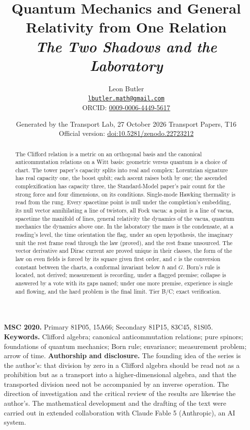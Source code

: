 \documentclass[11pt]{article}
\title{\bfseries Quantum Mechanics and General Relativity from One Relation\\[4pt]\large\itshape The Two Shadows and the Laboratory}
\author{Leon Butler\\ \normalsize\href{mailto:lbutler.math@gmail.com}{\texttt{lbutler.math@gmail.com}}\\ \normalsize ORCID: \href{https://orcid.org/0009-0006-4449-5617}{0009-0006-4449-5617}}
\date{Generated by the Transport Lab, 27 October 2026 \textperiodcentered{} Transport Papers, T16\\[3pt]\small Official version: \href{https://doi.org/10.5281/zenodo.22723212}{doi:10.5281/zenodo.22723212}}
\theoremstyle{definition}
\theoremstyle{plain}
\begin{document}
\maketitle
\begin{abstract}
\normalsize
The Clifford relation is a metric on an orthogonal basis and the canonical anticommutation relations on a Witt basis: geometric versus quantum is a choice of chart. The tower paper's capacity splits into real and complex: Lorentzian signature has real capacity one, the boost qubit; each ascent raises both by one; the ascended complexification has capacity three, the Standard-Model paper's pair count for the strong force and four dimensions, on its conditions. Single-mode Hawking thermality is read from the rung. Every spacetime point is null under the completion's embedding, its null vector annihilating a line of twistors, all Fock vacua: a point is a line of vacua, spacetime the manifold of lines, general relativity the dynamics of the vacua, quantum mechanics the dynamics above one. In the laboratory the mass is the condensate, at a reading's level, the time orientation the flag, under an open hypothesis, the imaginary unit the rest frame read through the law (proved), and the rest frame unsourced. The vector derivative and Dirac current are proved unique in their classes, the form of the law on even fields is forced by its square given first order, and $c$ is the conversion constant between the charts, a conformal invariant below $\hbar$ and $G$. Born's rule is located, not derived; measurement is recording, under a flagged premise; collapse is answered by a vote with its gaps named; under one more premise, experience is single and flowing, and the hard problem is the final limit. Tier B/C; exact verification.
\end{abstract}
\medskip
\noindent\textbf{MSC 2020.} Primary 81P05, 15A66; Secondary 81P15, 83C45, 81S05.\\
\textbf{Keywords.} Clifford algebra; canonical anticommutation relations; pure spinors; foundations of quantum mechanics; Born rule; envariance; measurement problem; arrow of time.
\newpage
\noindent \textbf{Authorship and disclosure. }The founding idea of the series is the author's: that division by zero in a Clifford algebra should be read not as a prohibition but as a transport into a higher-dimensional algebra, and that the transported division need not be accompanied by an inverse operation. The direction of investigation and the critical review of the results are likewise the author's. The mathematical development and the drafting of the text were carried out in extended collaboration with Claude Fable 5 (Anthropic), an AI system.
\end{document}
